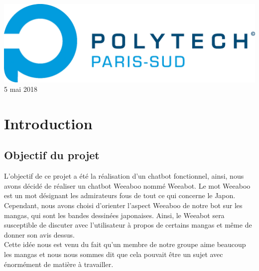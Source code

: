 \documentclass[paper=a4, fontsize=11pt]{article}
\begin{document}
\begin{titlepage}
		\includegraphics[width=0.8\linewidth]{polytech.png}\\[1cm]
		{\large 5 mai 2018}\\[2cm] 
		
		
		
		
		
		
		\vfill
	\end{titlepage}

\section{Introduction}

\subsection{Objectif du projet}
L'objectif de ce projet a été la réalisation d'un chatbot fonctionnel, ainsi, nous avons décidé de réaliser un chatbot Weeaboo nommé Weeabot. Le mot Weeaboo est un mot désignant les admirateurs fous de tout ce qui concerne le Japon. \\
Cependant, nous avons choisi d'orienter l'aspect Weeaboo de notre bot sur les mangas, qui sont les bandes dessinées japonaises. Ainsi, le Weeabot sera susceptible de discuter avec l'utilisateur à propos de certains mangas et même de donner son avis dessus. \\
Cette idée nous est venu du fait qu'un membre de notre groupe aime beaucoup les mangas et nous nous sommes dit que cela pouvait être un sujet avec énormément de matière à travailler.
\end{document}
